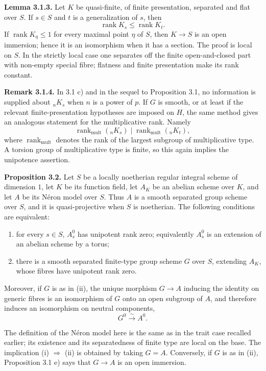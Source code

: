 \documentclass[11pt]{article}
\providecommand{\rank}{\operatorname{rank}}
\begin{document}
\textbf{Lemma 3.1.3.} Let \(K\) be quasi-finite, of finite presentation, separated and flat over \(S\).  If \(s\in S\) and \(t\) is a generalization of \(s\), then
\[
        \rank K_s\leq \rank K_t.
\]
If \(\rank K_\eta\leq 1\) for every maximal point \(\eta\) of \(S\), then \(K\to S\) is an open immersion; hence it is an isomorphism when it has a section.  The proof is local on \(S\).  In the strictly local case one separates off the finite open-and-closed part with non-empty special fibre; flatness and finite presentation make its rank constant.

\textbf{Remark 3.1.4.} In 3.1 c) and in the sequel to Proposition 3.1, no information is supplied about \({}_nK_s\) when \(n\) is a power of \(p\).  If \(G\) is smooth, or at least if the relevant finite-presentation hypotheses are imposed on \(H\), the same method gives an analogous statement for the multiplicative rank.  Namely
\begin{equation}\tag{3.1.4.1}
        \rank_{\mathrm{mult}}({}_nK_s)\mid \rank_{\mathrm{mult}}({}_nK_t),
\end{equation}
where \(\rank_{\mathrm{mult}}\) denotes the rank of the largest subgroup of multiplicative type.  A torsion group of multiplicative type is finite, so this again implies the unipotence assertion.

\textbf{Proposition 3.2.} Let \(S\) be a locally noetherian regular integral scheme of dimension \(1\), let \(K\) be its function field, let \(A_K\) be an abelian scheme over \(K\), and let \(A\) be its Néron model over \(S\).  Thus \(A\) is a smooth separated group scheme over \(S\), and it is quasi-projective when \(S\) is noetherian.  The following conditions are equivalent:
\begin{enumerate}[label=(\roman*)]
\item for every \(s\in S\), \(A_s^0\) has unipotent rank zero; equivalently \(A_s^0\) is an extension of an abelian scheme by a torus;
\item there is a smooth separated finite-type group scheme \(G\) over \(S\), extending \(A_K\), whose fibres have unipotent rank zero.
\end{enumerate}
Moreover, if \(G\) is as in (ii), the unique morphism \(G\to A\) inducing the identity on generic fibres is an isomorphism of \(G\) onto an open subgroup of \(A\), and therefore induces an isomorphism on neutral components,
\[
        G^0\xrightarrow{\sim}A^0.
\]

The definition of the Néron model here is the same as in the trait case recalled earlier; its existence and its separatedness of finite type are local on the base.  The implication (i) \(\Rightarrow\) (ii) is obtained by taking \(G=A\).  Conversely, if \(G\) is as in (ii), Proposition 3.1 e) says that \(G\to A\) is an open immersion.
\end{document}

